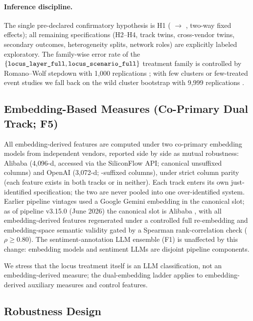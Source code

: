 \paragraph{Inference discipline.}
The single pre-declared confirmatory hypothesis is H1 ( $\to$
, two-way fixed effects); all remaining specifications
(H2--H4, track twins, cross-vendor twins, secondary outcomes, heterogeneity splits,
network roles) are explicitly labeled exploratory. The family-wise error rate of the
$\{\texttt{locus\_layer\_full}, \texttt{locus\_scenario\_full}\}$ treatment family is
controlled by Romano--Wolf stepdown with 1{,}000 replications
\parencite{romanowolf2005stepdown}; with few clusters or few-treated event studies we
fall back on the wild cluster bootstrap with 9{,}999 replications
\parencite{roodman2019boottest}.

\subsection{Embedding-Based Measures (Co-Primary Dual Track; F5)}

All embedding-derived features are computed under two co-primary
embedding models from independent vendors, reported side by side as
mutual robustness: Alibaba  (4{,}096-d,
accessed via the SiliconFlow API; canonical unsuffixed columns) and
OpenAI  (3{,}072-d; -suffixed
columns), under strict column parity (each feature exists in both
tracks or in neither). Each track enters its own just-identified
specification; the two are never pooled into one over-identified
system. Earlier pipeline vintages used a Google Gemini embedding in
the canonical slot; as of pipeline v3.15.0 (June 2026) the canonical
slot is Alibaba , with all embedding-derived
features regenerated under a controlled full re-embedding and
embedding-space semantic validity gated by a Spearman
rank-correlation check ($\rho \geq 0.80$). The sentiment-annotation
LLM ensemble (F1) is unaffected by this change: embedding models and
sentiment LLMs are disjoint pipeline components.

We stress that the locus treatment itself is an LLM classification, not an
embedding-derived measure; the dual-embedding ladder applies to embedding-derived
auxiliary measures and control features.

\subsection{Robustness Design}\label{subsec:robust}

